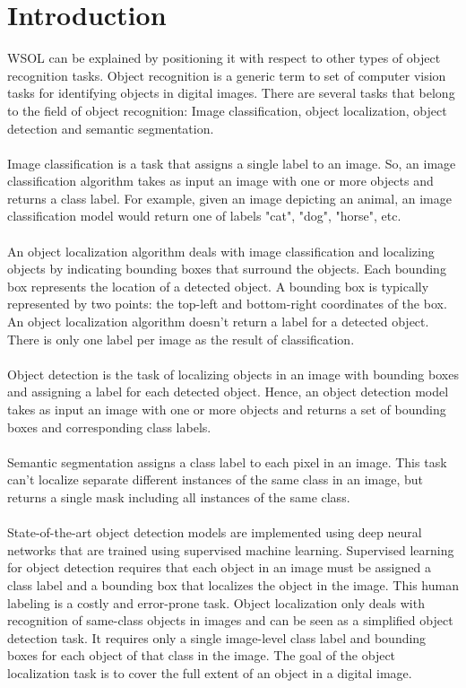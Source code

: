 \chapter{Introduction}

\gls{WSOL} can be explained by positioning it with respect to other types of object recognition tasks. Object recognition is a generic term to set of computer vision tasks for identifying objects in digital images. There are several tasks that belong to the field of object recognition: Image classification, object localization, object detection and semantic segmentation. 
\\\\
Image classification is a task that assigns a single label to an image. So, an image classification algorithm takes as input an image with one or more objects and returns a class label. For example, given an image depicting an animal, an image classification model would return one of labels "cat", "dog", "horse", etc. 
\\\\
An object localization algorithm deals with image classification and localizing objects by indicating bounding boxes that surround the objects. Each bounding box represents the location of a detected object. A bounding box is typically represented by two points: the top-left and bottom-right coordinates of the box. An object localization algorithm doesn't return a label for a detected object. There is only one label per image as the result of classification.
\\\\
Object detection is the task of localizing objects in an image with bounding boxes and assigning a label for each detected object. Hence, an object detection model takes as input an image with one or more objects and returns a set of bounding boxes and corresponding class labels.
\\\\
Semantic segmentation assigns a class label to each pixel in an image. This task can't localize separate different instances of the same class in an image, but returns a single mask including all instances of the same class.
\\\\
State-of-the-art object detection models are implemented using deep neural networks that are trained using supervised machine learning. Supervised learning for object detection requires that each object in an image must be assigned a class label and a bounding box that localizes the object in the image. This human labeling is a costly and error-prone task. Object localization only deals with recognition of same-class objects in images and can be seen as a simplified object detection task. It requires only a single image-level class label and bounding boxes for each object of that class in the image. The goal of the object localization task is to cover the full extent of an object in a digital image.
